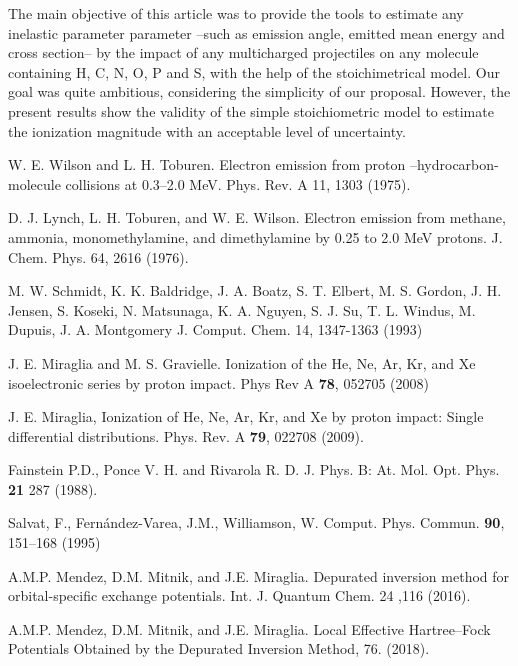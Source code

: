 \documentclass[preprint]{revtex4-2}
\begin{document}
The main objective of this article was to provide the tools to estimate 
any inelastic parameter parameter --such as emission angle, emitted mean
energy and cross section-- by the impact of any multicharged projectiles 
on any molecule containing H, C, N, O, P and S, with the help of the
stoichimetrical model. Our goal was quite ambitious, considering the
simplicity of our proposal. However, the present results show the 
validity of the simple stoichiometric model to estimate the ionization 
magnitude with an acceptable level of uncertainty.  

\bigskip

\begin{thebibliography}{99}


W. E. Wilson and L. H. Toburen. Electron emission from
proton --hydrocarbon-molecule collisions at 0.3--2.0 MeV. 
Phys. Rev. A 11, 1303 (1975).

D. J. Lynch, L. H. Toburen, and W. E. Wilson. Electron
emission from methane, ammonia, monomethylamine, and dimethylamine by 0.25
to 2.0 MeV protons. 
J. Chem. Phys. 64, 2616 (1976).


M. W. Schmidt, K. K. Baldridge, J. A. Boatz, S. T. Elbert, M. S. Gordon, 
J. H. Jensen, S. Koseki, N. Matsunaga, K. A. Nguyen, S. J. Su, T. L. Windus, 
M. Dupuis, J. A. Montgomery 
J. Comput. Chem. 14, 1347-1363 (1993)

J. E. Miraglia and M. S. Gravielle. Ionization of the
He, Ne, Ar, Kr, and Xe isoelectronic series by proton impact. 
Phys Rev A \textbf{78}, 052705 (2008)

J. E. Miraglia, Ionization of He, Ne, Ar, Kr, and Xe
by proton impact: Single differential distributions. 
Phys. Rev. A \textbf{79}, 022708 (2009).

Fainstein P.D., Ponce V. H. and Rivarola R. D. 
J. Phys. B: At. Mol. Opt. Phys. \textbf{21} 287 (1988).

Salvat, F., Fernández-Varea, J.M., Williamson, W.
Comput. Phys. Commun. \textbf{90}, 151--168 (1995)

A.M.P. Mendez, D.M. Mitnik, and J.E. Miraglia.
Depurated inversion method for orbital-specific exchange potentials. 
Int. J. Quantum Chem. 24 ,116 (2016).

A.M.P. Mendez, D.M. Mitnik, and J.E. Miraglia. Local Effective 
Hartree--Fock Potentials Obtained by the Depurated Inversion Method,
76. (2018).


\end{thebibliography}
\end{document}
